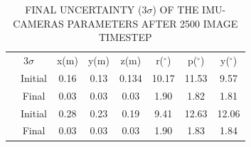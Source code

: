 \documentclass[a4paper, 10pt, conference]{ieeeconf}      %
\begin{document}
\begin{table}
	\caption{FINAL UNCERTAINTY ($ 3 \sigma $) OF THE IMU-CAMERAS PARAMETERS AFTER 2500 IMAGE TIMESTEP}
	\label{multiprogram}
	\begin{center}
		\begin{tabular}{|c|c||c|c|c|c|c|c|}
			\hline
			\multicolumn{2}{|c||}{$ 3 \sigma $} & x(m) & y(m) & z(m) & r($ ^\circ $) & p($ ^\circ $) & y($ ^\circ $) \\
			\hhline{==#======}
			\multirow{2}{*}{CAM0}
			&Initial & 0.16 & 0.13 & 0.134 & 10.17  & 11.53 &   9.57 \\
			
			& Final & 0.03 &    0.03&    0.03 & 1.90&   1.82&    1.81\\
			\hhline{==#======}
			\multirow{2}{*}{CAM1}
			&Initial &0.28&    0.23&    0.19 &  9.41&   12.63&   12.06 \\
			
			&Final & 0.03 &   0.03&    0.03 & 1.90 &   1.83&    1.84 \\
			\hline
		\end{tabular}
	\end{center}
\end{table}



\addtolength{\textheight}{-12cm}   %

















\end{document}
